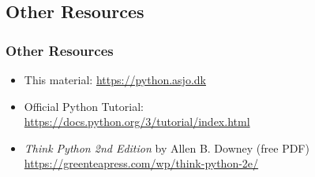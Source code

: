 {\subsection{Other Resources}
\begin{frame}
  \frametitle{Other Resources}
  \vspace{5mm}
  
  \begin{itemize}
    \item This material: \url{https://python.asjo.dk}
    \item Official Python Tutorial:\\
          \url{https://docs.python.org/3/tutorial/index.html}
    \item \textsl{Think Python 2nd Edition} by Allen B. Downey (free PDF)\\
          \url{https://greenteapress.com/wp/think-python-2e/}
  \end{itemize}
\end{frame}

}


